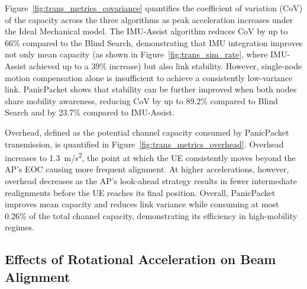 \documentclass[fleqn,10pt]{wlscirep}
\begin{document}
Figure~\ref{fig:trans_metrics_covariance} quantifies the coefficient of variation (CoV) of the capacity across the three algorithms as peak acceleration increases under the Ideal Mechanical model. The IMU-Assist algorithm reduces CoV by up to 66\% compared to the Blind Search, demonstrating that IMU integration improves not only mean capacity (as shown in Figure~\ref{fig:trans_sim_rate}, where IMU-Assist achieved up to a 39\% increase) but also link stability. However, single-node motion compensation alone is insufficient to achieve a consistently low-variance link. PanicPacket shows that stability can be further improved when both nodes share mobility awareness, reducing CoV by up to 89.2\% compared to Blind Search and by 23.7\% compared to IMU-Assist.

Overhead, defined as the potential channel capacity consumed by PanicPacket transmission, is quantified in Figure~\ref{fig:trans_metrics_overhead}. Overhead increases to \SI{1.3}{m/s^2}, the point at which the UE consistently moves beyond the AP's EOC causing more frequent alignment. At higher accelerations, however, overhead decreases as the AP's look-ahead strategy results in fewer intermediate realignments before the UE reaches its final position. Overall, PanicPacket improves mean capacity and reduces link variance while consuming at most 0.26\% of the total channel capacity, demonstrating its efficiency in high-mobility regimes.

\subsection*{Effects of Rotational Acceleration on Beam Alignment}
\end{document}
